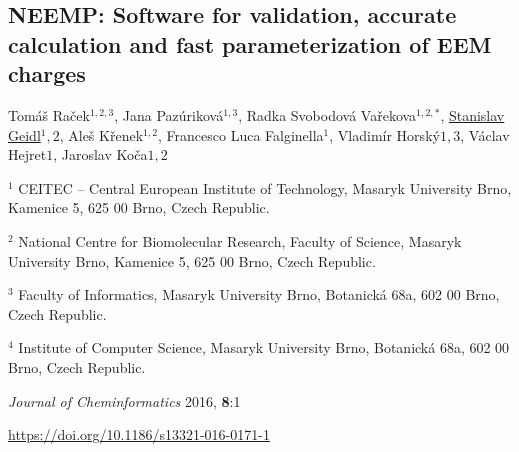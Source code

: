\begin{center}

\section{NEEMP: Software
for validation, accurate calculation and fast parameterization of EEM charges}

Tomáš Raček$^{1,2,3}$, Jana Pazúriková$^{1,3}$, Radka Svobodová Vařekova$^{1,2,*}$,
\underline{Stanislav Geidl$^1,2$}, Aleš Křenek$^{1,2}$, Francesco Luca
Falginella$^1$, Vladimír Horský$1,3$, Václav Hejret$1$, Jaroslav Koča${1,2}$


\vspace{1cm}


$^1$ CEITEC -- Central European Institute of Technology,
Masaryk University Brno, Kamenice 5, 625 00 Brno, Czech Republic.

$^2$ National Centre for Biomolecular Research, Faculty of Science,
Masaryk University Brno, Kamenice 5, 625 00 Brno, Czech Republic.

$^3$ Faculty of Informatics, Masaryk University Brno, Botanická 68a, 602 00 Brno,
Czech Republic.

$^4$ Institute of Computer Science, Masaryk University Brno, Botanická 68a,
602 00 Brno, Czech Republic.

\vspace{1cm}

\textit{Journal of Cheminformatics} 2016, \textbf{8}:1

\vspace{1cm}

\url{https://doi.org/10.1186/s13321-016-0171-1}

\end{center}


